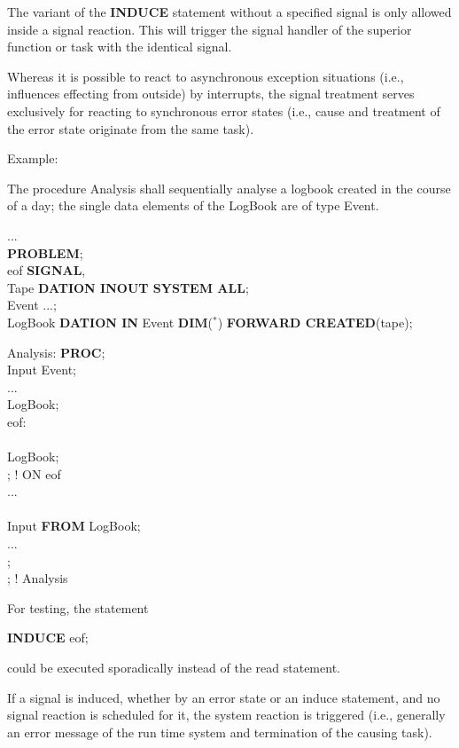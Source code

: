 The variant of the {\bf INDUCE} statement without a specified signal is 
only allowed inside a signal reaction. This will trigger the signal handler
of the superior function or task with the identical signal.


Whereas it is possible to react to asynchronous exception situations
(i.e., influences effecting from outside) by interrupts, the signal
treatment serves exclusively for reacting to synchronous error states
(i.e., cause and treatment of the error state originate from the same
task).

Example:

The procedure Analysis shall sequentially analyse a logbook created
in the course of a day; the single data elements of the LogBook are of
type Event.

...\\
{\bf PROBLEM};\\
 eof {\bf SIGNAL},\\
\x \x Tape {\bf DATION INOUT SYSTEM ALL};\\
 Event ...;\\
 LogBook {\bf DATION IN} Event {\bf DIM}($^*$) {\bf FORWARD CREATED}(tape);

Analysis: {\bf PROC};\\
 Input Event;\\
\x ...\\
 LogBook;\\
 eof:\\
\x {}\\
\x \x {} LogBook;\\
\x {}; ! ON eof\\
\x ...\\
\\
\x {} Input {\bf FROM} LogBook;\\
\x \x ...\\
;\\
; ! Analysis

For testing, the statement

{\bf INDUCE} eof;

could be executed sporadically instead of the read statement.

If a signal is induced, whether by an error state or an induce
statement, and no signal reaction is scheduled for it, the system
reaction is triggered (i.e., generally an error message of the run time
system and termination of the causing task).

